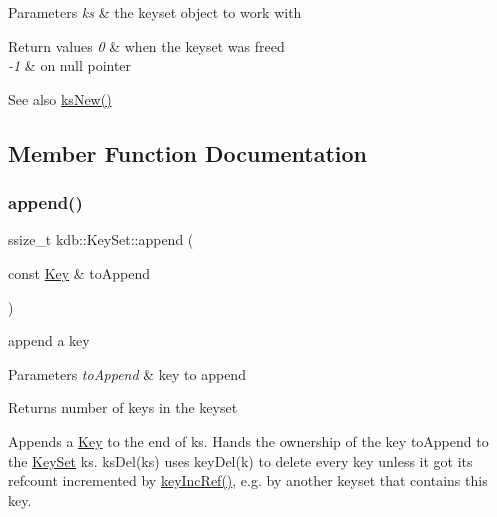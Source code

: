 \begin{DoxyParams}{Parameters}
{\em ks} & the keyset object to work with \\
\hline
\end{DoxyParams}

\begin{DoxyRetVals}{Return values}
{\em 0} & when the keyset was freed \\
\hline
{\em -\/1} & on null pointer \\
\hline
\end{DoxyRetVals}
\begin{DoxySeeAlso}{See also}
\hyperlink{group__keyset_ga671e1aaee3ae9dc13b4834a4ddbd2c3c}{ks\+New()} 
\end{DoxySeeAlso}


\subsection{Member Function Documentation}
\mbox{\label{classkdb_1_1KeySet_a0d4b2f3aa9f58d10053561135b50233e}} 
\subsubsection{\texorpdfstring{append()}{append()}\hspace{0.1cm}{\footnotesize\ttfamily [1/2]}}
{\footnotesize\ttfamily ssize\+\_\+t kdb\+::\+Key\+Set\+::append (\begin{DoxyParamCaption}\item[{const \hyperlink{classkdb_1_1Key}{Key} \&}]{to\+Append }\end{DoxyParamCaption})\hspace{0.3cm}{\ttfamily [inline]}}



append a key 


\begin{DoxyParams}{Parameters}
{\em to\+Append} & key to append\\
\hline
\end{DoxyParams}
\begin{DoxyReturn}{Returns}
number of keys in the keyset
\end{DoxyReturn}
Appends a \hyperlink{classkdb_1_1Key}{Key} to the end of {\ttfamily ks}. Hands the ownership of the key {\ttfamily to\+Append} to the \hyperlink{classkdb_1_1KeySet}{Key\+Set} {\ttfamily ks}. ks\+Del(ks) uses key\+Del(k) to delete every key unless it got its refcount incremented by \hyperlink{group__key_ga6970a6f254d67af7e39f8e469bb162f1}{key\+Inc\+Ref()}, e.\+g. by another keyset that contains this key.

